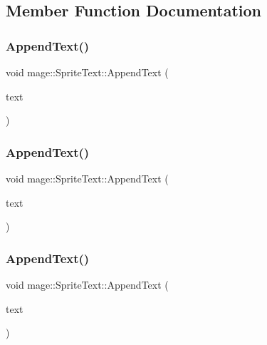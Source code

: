 \subsection{Member Function Documentation}
\hypertarget{classmage_1_1_sprite_text_acf993532a7b2e6ebb761b9b47cbdba98}{}\label{classmage_1_1_sprite_text_acf993532a7b2e6ebb761b9b47cbdba98} 
\subsubsection{\texorpdfstring{Append\+Text()}{AppendText()}\hspace{0.1cm}{\footnotesize\ttfamily [1/3]}}
{\footnotesize\ttfamily void mage\+::\+Sprite\+Text\+::\+Append\+Text (\begin{DoxyParamCaption}\item[{const wstring \&}]{text }\end{DoxyParamCaption})}

\hypertarget{classmage_1_1_sprite_text_a462809b9138f94720f972505a4f74d81}{}\label{classmage_1_1_sprite_text_a462809b9138f94720f972505a4f74d81} 
\subsubsection{\texorpdfstring{Append\+Text()}{AppendText()}\hspace{0.1cm}{\footnotesize\ttfamily [2/3]}}
{\footnotesize\ttfamily void mage\+::\+Sprite\+Text\+::\+Append\+Text (\begin{DoxyParamCaption}\item[{const wchar\+\_\+t $\ast$}]{text }\end{DoxyParamCaption})}

\hypertarget{classmage_1_1_sprite_text_a6f0bb93c634d9b05466d3998bcaf957a}{}\label{classmage_1_1_sprite_text_a6f0bb93c634d9b05466d3998bcaf957a} 
\subsubsection{\texorpdfstring{Append\+Text()}{AppendText()}\hspace{0.1cm}{\footnotesize\ttfamily [3/3]}}
{\footnotesize\ttfamily void mage\+::\+Sprite\+Text\+::\+Append\+Text (\begin{DoxyParamCaption}\item[{const \hyperlink{structmage_1_1_sprite_text_item}{Sprite\+Text\+Item} \&}]{text }\end{DoxyParamCaption})}

